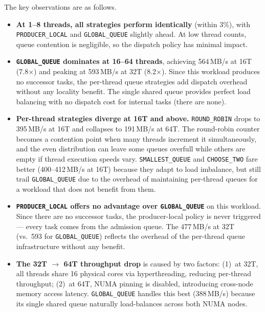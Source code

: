 The key observations are as follows.
% 
\begin{itemize}
    \item \textbf{At 1--8 threads, all strategies perform identically} (within 3\%), with \texttt{PRODUCER\_LOCAL} and \texttt{GLOBAL\_QUEUE} slightly ahead.
    At low thread counts, queue contention is negligible, so the dispatch policy has minimal impact.

    \item \textbf{\texttt{GLOBAL\_QUEUE} dominates at 16--64 threads}, achieving 564\,MB/s at 16T (7.8$\times$) and peaking at 593\,MB/s at 32T (8.2$\times$).
    Since this workload produces no successor tasks, the per-thread queue strategies add dispatch overhead without any locality benefit.
    The single shared queue provides perfect load balancing with no dispatch cost for internal tasks (there are none).

    \item \textbf{Per-thread strategies diverge at 16T and above.}
    \texttt{ROUND\_ROBIN} drops to 395\,MB/s at 16T and collapses to 191\,MB/s at 64T.
    The round-robin counter becomes a contention point when many threads increment it simultaneously, and the even distribution can leave some queues overfull while others are empty if thread execution speeds vary.
    \texttt{SMALLEST\_QUEUE} and \texttt{CHOOSE\_TWO} fare better (400--412\,MB/s at 16T) because they adapt to load imbalance, but still trail \texttt{GLOBAL\_QUEUE} due to the overhead of maintaining per-thread queues for a workload that does not benefit from them.

    \item \textbf{\texttt{PRODUCER\_LOCAL} offers no advantage over \texttt{GLOBAL\_QUEUE}} on this workload.
    Since there are no successor tasks, the producer-local policy is never triggered — every task comes from the admission queue.
    The 477\,MB/s at 32T (vs.\ 593 for \texttt{GLOBAL\_QUEUE}) reflects the overhead of the per-thread queue infrastructure without any benefit.

    \item \textbf{The 32T $\rightarrow$ 64T throughput drop} is caused by two factors:
    (1)~at 32T, all threads share 16 physical cores via hyperthreading, reducing per-thread throughput;
    (2)~at 64T, NUMA pinning is disabled, introducing cross-node memory access latency.
    \texttt{GLOBAL\_QUEUE} handles this best (388\,MB/s) because its single shared queue naturally load-balances across both NUMA nodes.
\end{itemize}

